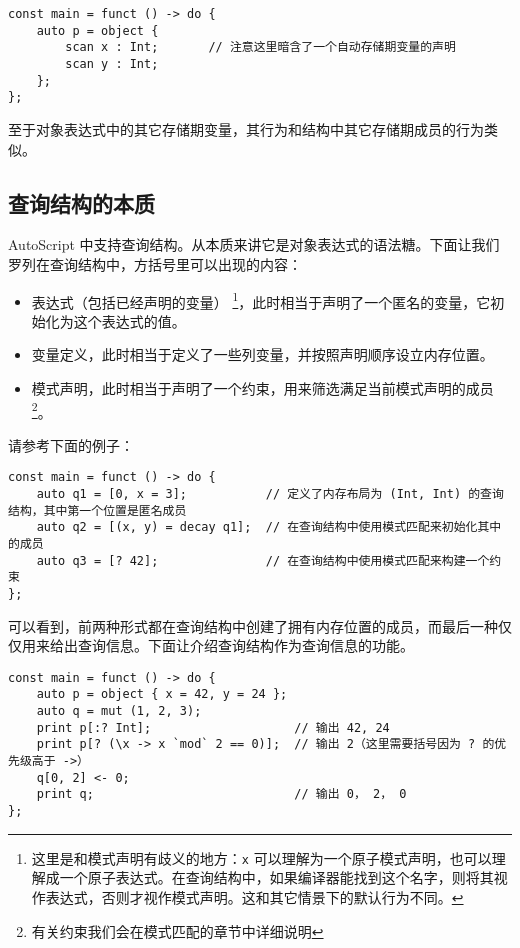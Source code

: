 \begin{lstlisting}
const main = funct () -> do {
	auto p = object {
		scan x : Int;		// 注意这里暗含了一个自动存储期变量的声明
		scan y : Int;
	};
};
\end{lstlisting}

至于对象表达式中的其它存储期变量，其行为和结构中其它存储期成员的行为类似。

\subsection{查询结构的本质}

AutoScript 中支持查询结构。从本质来讲它是对象表达式的语法糖。下面让我们罗列在查询结构中，方括号里可以出现的内容：

\begin{itemize}
	\item 表达式（包括已经声明的变量） \footnote{这里是和模式声明有歧义的地方：\lstinline!x! 可以理解为一个原子模式声明，也可以理解成一个原子表达式。在查询结构中，如果编译器能找到这个名字，则将其视作表达式，否则才视作模式声明。这和其它情景下的默认行为不同。}，此时相当于声明了一个匿名的变量，它初始化为这个表达式的值。
	\item 变量定义，此时相当于定义了一些列变量，并按照声明顺序设立内存位置。
	\item 模式声明，此时相当于声明了一个约束，用来筛选满足当前模式声明的成员 \footnote{有关约束我们会在模式匹配的章节中详细说明}。
\end{itemize}

请参考下面的例子：

\begin{lstlisting}
const main = funct () -> do {
	auto q1 = [0, x = 3];			// 定义了内存布局为 (Int, Int) 的查询结构，其中第一个位置是匿名成员
	auto q2 = [(x, y) = decay q1];	// 在查询结构中使用模式匹配来初始化其中的成员
	auto q3 = [? 42];				// 在查询结构中使用模式匹配来构建一个约束
};
\end{lstlisting}

可以看到，前两种形式都在查询结构中创建了拥有内存位置的成员，而最后一种仅仅用来给出查询信息。下面让介绍查询结构作为查询信息的功能。

\begin{lstlisting}
const main = funct () -> do {
	auto p = object { x = 42, y = 24 };
	auto q = mut (1, 2, 3);
	print p[:? Int];					// 输出 42, 24
	print p[? (\x -> x `mod` 2 == 0)];	// 输出 2（这里需要括号因为 ? 的优先级高于 ->）
	q[0, 2] <- 0;
	print q;							// 输出 0， 2， 0
};
\end{lstlisting}

